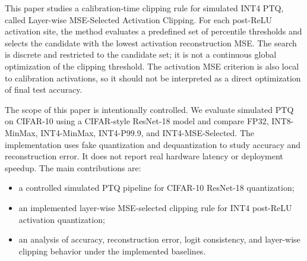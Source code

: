 This paper studies a calibration-time clipping rule for simulated INT4 PTQ, called Layer-wise MSE-Selected Activation Clipping. For each post-ReLU activation site, the method evaluates a predefined set of percentile thresholds and selects the candidate with the lowest activation reconstruction MSE. The search is discrete and restricted to the candidate set; it is not a continuous global optimization of the clipping threshold. The activation MSE criterion is also local to calibration activations, so it should not be interpreted as a direct optimization of final test accuracy.

The scope of this paper is intentionally controlled. We evaluate simulated PTQ on CIFAR-10 using a CIFAR-style ResNet-18 model and compare FP32, INT8-MinMax, INT4-MinMax, INT4-P99.9, and INT4-MSE-Selected. The implementation uses fake quantization and dequantization to study accuracy and reconstruction error. It does not report real hardware latency or deployment speedup. The main contributions are:
\begin{itemize}
    \item a controlled simulated PTQ pipeline for CIFAR-10 ResNet-18 quantization;
    \item an implemented layer-wise MSE-selected clipping rule for INT4 post-ReLU activation quantization;
    \item an analysis of accuracy, reconstruction error, logit consistency, and layer-wise clipping behavior under the implemented baselines.
\end{itemize}
